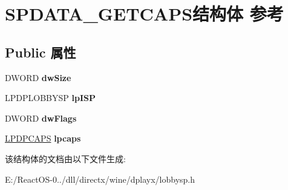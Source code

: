 \hypertarget{struct_s_p_d_a_t_a___g_e_t_c_a_p_s}{}\section{S\+P\+D\+A\+T\+A\+\_\+\+G\+E\+T\+C\+A\+P\+S结构体 参考}
\label{struct_s_p_d_a_t_a___g_e_t_c_a_p_s}
\subsection*{Public 属性}
\begin{DoxyCompactItemize}
\item 
\mbox{\label{struct_s_p_d_a_t_a___g_e_t_c_a_p_s_a2a711b6ad889fbb74ce2aa483fb57fd4}} 
D\+W\+O\+RD {\bfseries dw\+Size}
\item 
\mbox{\label{struct_s_p_d_a_t_a___g_e_t_c_a_p_s_a9e5bb6bc8ee665414298184d9b6794ed}} 
L\+P\+D\+P\+L\+O\+B\+B\+Y\+SP {\bfseries lp\+I\+SP}
\item 
\mbox{\label{struct_s_p_d_a_t_a___g_e_t_c_a_p_s_a483b7971dc4af77e89ecc1b1d45c8229}} 
D\+W\+O\+RD {\bfseries dw\+Flags}
\item 
\mbox{\label{struct_s_p_d_a_t_a___g_e_t_c_a_p_s_abb1d462fbd2a495909d47449c92b7f1a}} 
\hyperlink{structtag_d_p_c_a_p_s}{L\+P\+D\+P\+C\+A\+PS} {\bfseries lpcaps}
\end{DoxyCompactItemize}


该结构体的文档由以下文件生成\+:\begin{DoxyCompactItemize}
\item 
E\+:/\+React\+O\+S-\/0../dll/directx/wine/dplayx/lobbysp.\+h\end{DoxyCompactItemize}
